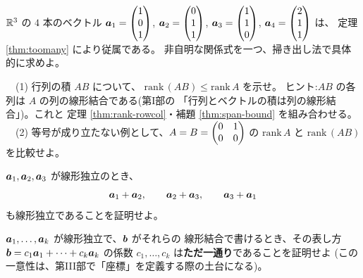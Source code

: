 \begin{mondai}[発展]\label{q:rank-ex9}
$\mathbb{R}^3$ の $4$ 本のベクトル
$\bm{a}_1 = \begin{pmatrix}1 \\ 0 \\ 1\end{pmatrix}$, $\bm{a}_2 = \begin{pmatrix}0 \\ 1 \\ 1\end{pmatrix}$,
$\bm{a}_3 = \begin{pmatrix}1 \\ 1 \\ 0\end{pmatrix}$, $\bm{a}_4 = \begin{pmatrix}2 \\ 1 \\ 1\end{pmatrix}$ は、
定理 \ref{thm:toomany} により従属である。
非自明な関係式を一つ、掃き出し法で具体的に求めよ。
\end{mondai}

\begin{mondai}[発展]\label{q:rank-ex10}
　(1) 行列の積 $AB$ について、
$\mathrm{rank}\,(AB) \le \mathrm{rank}\,A$ を示せ。
ヒント:$AB$ の各列は $A$ の列の線形結合である(第I部の
「行列とベクトルの積は列の線形結合」)。これと
定理 \ref{thm:rank-rowcol}・補題 \ref{thm:span-bound} を組み合わせる。\\
　(2) 等号が成り立たない例として、$A = B = \begin{pmatrix}0 & 1 \\ 0 & 0\end{pmatrix}$ の
$\mathrm{rank}\,A$ と $\mathrm{rank}\,(AB)$ を比較せよ。
\end{mondai}

\begin{mondai}[証明]\label{q:rank-ex11}
$\bm{a}_1, \bm{a}_2, \bm{a}_3$ が線形独立のとき、
\[
\bm{a}_1 + \bm{a}_2, \qquad \bm{a}_2 + \bm{a}_3, \qquad
\bm{a}_3 + \bm{a}_1
\]
も線形独立であることを証明せよ。
\end{mondai}

\begin{mondai}[証明]\label{q:rank-ex12}
$\bm{a}_1, \dots, \bm{a}_k$ が線形独立で、$\bm{b}$ がそれらの
線形結合で書けるとき、その表し方
$\bm{b} = c_1\bm{a}_1 + \cdots + c_k\bm{a}_k$ の係数
$c_1, \dots, c_k$ は\textbf{ただ一通り}であることを証明せよ
(この一意性は、第III部で「座標」を定義する際の土台になる)。
\end{mondai}

